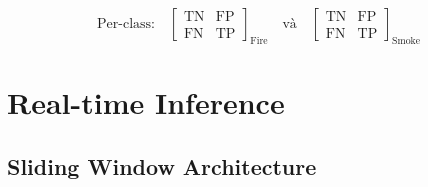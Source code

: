 \documentclass[12pt,a4paper]{article}
\begin{document}
\[
\text{Per-class:}\quad
\begin{bmatrix} \text{TN} & \text{FP} \\ \text{FN} & \text{TP} \end{bmatrix}_{\text{Fire}}
\quad\text{và}\quad
\begin{bmatrix} \text{TN} & \text{FP} \\ \text{FN} & \text{TP} \end{bmatrix}_{\text{Smoke}}
\]

\section{Real-time Inference}

\subsection{Sliding Window Architecture}
\end{document}
